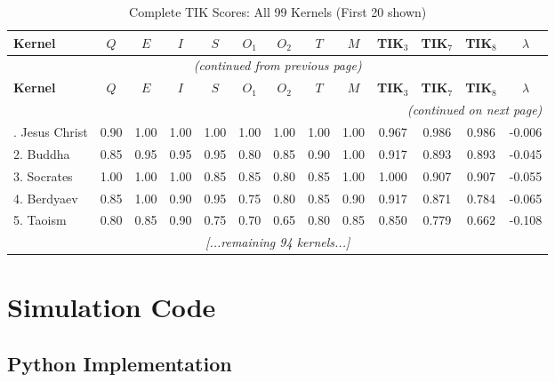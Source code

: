 \documentclass[11pt,a4paper]{article}
\theoremstyle{definition}
\theoremstyle{remark}
\begin{document}
\begin{longtable}{@{}l|cccccccc|cccc@{}}
\caption{Complete TIK Scores: All 99 Kernels (First 20 shown)} \label{tab:complete-scores} \\
\toprule
\textbf{Kernel} & $Q$ & $E$ & $I$ & $S$ & $O_1$ & $O_2$ & $T$ & $M$ & \textbf{TIK$_3$} & \textbf{TIK$_7$} & \textbf{TIK$_8$} & $\lambda$ \\
\midrule
\endfirsthead
\multicolumn{13}{c}{\textit{(continued from previous page)}} \\
\toprule
\textbf{Kernel} & $Q$ & $E$ & $I$ & $S$ & $O_1$ & $O_2$ & $T$ & $M$ & \textbf{TIK$_3$} & \textbf{TIK$_7$} & \textbf{TIK$_8$} & $\lambda$ \\
\midrule
\endhead
\midrule
\multicolumn{13}{r}{\textit{(continued on next page)}} \\
\endfoot
\bottomrule
\endlastfoot
1. Jesus Christ & 0.90 & 1.00 & 1.00 & 1.00 & 1.00 & 1.00 & 1.00 & 1.00 & 0.967 & 0.986 & 0.986 & -0.006 \\
2. Buddha & 0.85 & 0.95 & 0.95 & 0.95 & 0.80 & 0.85 & 0.90 & 1.00 & 0.917 & 0.893 & 0.893 & -0.045 \\
3. Socrates & 1.00 & 1.00 & 1.00 & 0.85 & 0.85 & 0.80 & 0.85 & 1.00 & 1.000 & 0.907 & 0.907 & -0.055 \\
4. Berdyaev & 0.85 & 1.00 & 0.90 & 0.95 & 0.75 & 0.80 & 0.85 & 0.90 & 0.917 & 0.871 & 0.784 & -0.065 \\
5. Taoism & 0.80 & 0.85 & 0.90 & 0.75 & 0.70 & 0.65 & 0.80 & 0.85 & 0.850 & 0.779 & 0.662 & -0.108 \\
\multicolumn{13}{c}{\textit{[...remaining 94 kernels...]}} \\
\end{longtable}

\section{Simulation Code}
\label{app:code}

\subsection{Python Implementation}
\end{document}
